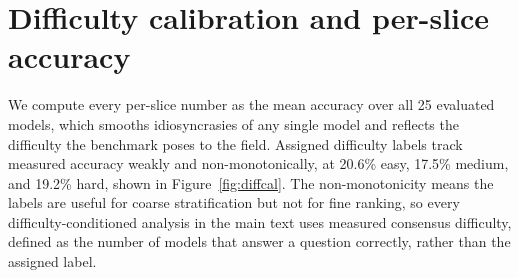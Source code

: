 \documentclass{article}
\newcommand{\nummodels}{25}
\begin{document}
\section{Difficulty calibration and per-slice accuracy}
\label{app:diffcal}
We compute every per-slice number as the mean accuracy over all \nummodels{} evaluated models, which smooths idiosyncrasies of any single model and reflects the difficulty the benchmark poses to the field. Assigned difficulty labels track measured accuracy weakly and non-monotonically, at 20.6\% easy, 17.5\% medium, and 19.2\% hard, shown in Figure~\ref{fig:diffcal}. The non-monotonicity means the labels are useful for coarse stratification but not for fine ranking, so every difficulty-conditioned analysis in the main text uses measured consensus difficulty, defined as the number of models that answer a question correctly, rather than the assigned label.
\end{document}
